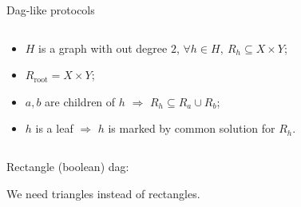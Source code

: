 \begin{frame}{Dag-like protocols}
    \vspace{-0.8cm}
    \begin{columns}[t]
        \begin{column}{0.58\textwidth}
            \begin{itemize}
                \item $H$ is a graph with out degree $2$, $\forall h \in H, ~ R_h \subseteq X \times Y$;
                \item $R_{\mathrm{root}} = X \times Y$;
                \item $a, b$ are children of $h$ $\Rightarrow$ $R_{h} \subseteq R_{a} \cup R_{b}$;
                \item $h$ is a leaf $\Rightarrow$ $h$ is marked by common solution for $R_h$.
            \end{itemize}
        \end{column}

		\begin{column}{0.38\textwidth}
            \begin{center}
                
            \end{center}
		\end{column}
	\end{columns}

    \pause
    \begin{center}
        Rectangle (boolean) dag:
        
        \vspace{0.2cm}
        
    \end{center}

    We need \alert{triangles} instead of rectangles.

\end{frame}


